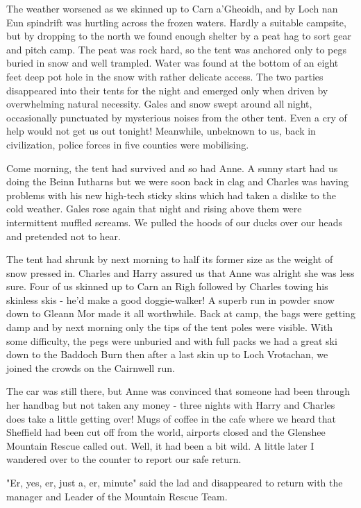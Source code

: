 \documentclass[a5paper,openany,font 10pt]{scrbook}
\begin{document}
The weather worsened as we skinned  up to Carn a'Gheoidh,
and by Loch nan Eun spindrift was hurtling across the frozen
waters. Hardly a suitable campsite, but by dropping to the north
we found enough shelter by a peat hag to sort gear and pitch
camp. The peat was rock hard, so the tent was anchored only to
pegs buried in snow and well trampled.  Water was found at the
bottom of an  eight feet deep pot hole in the snow  with rather
delicate access. The two parties disappeared into their tents for
the night and emerged only when driven by overwhelming natural
necessity. Gales and snow swept around all night, occasionally
punctuated by  mysterious noises from the other tent. Even a cry
of help would not get us out tonight! Meanwhile, unbeknown to us,
back in civilization, police forces in five counties were
mobilising.

Come morning, the tent had survived and so had Anne. A sunny
start had us doing the Beinn Iutharns but we were soon back in
clag and Charles was having problems with his new high-tech
sticky skins which had taken a dislike to the cold weather. Gales
rose again that night and rising above them were intermittent
muffled screams. We pulled the hoods of our ducks over our heads
and pretended not to hear.

The tent had shrunk by next morning to half its former size
as the weight of snow pressed in. Charles and Harry assured us
that Anne was alright   she was less sure. Four of us skinned up
to Carn an Righ followed by Charles towing his skinless skis -
he'd make a good doggie-walker! A superb run in powder snow down
to Gleann Mor made it all worthwhile. Back at camp, the bags were
getting damp and by next morning only the tips of the tent poles
were visible. With some difficulty, the pegs were unburied and
with full packs we had a great ski down to the Baddoch Burn  then
after a last skin up to Loch Vrotachan, we joined the crowds on
the Cairnwell run.

The car was still there, but Anne was convinced that someone
had been through her handbag but not taken any money - three
nights with Harry and Charles does take a little getting over!
Mugs of coffee in the cafe where we heard that Sheffield had been
cut off from the world, airports closed and the Glenshee Mountain
Rescue called out. Well, it had been a bit wild. A little later I
wandered over to the counter to report our safe return.

"Er, yes, er, just a, er, minute" said the lad  and
disappeared to return with the manager and Leader of the Mountain
Rescue Team.
\end{document}

